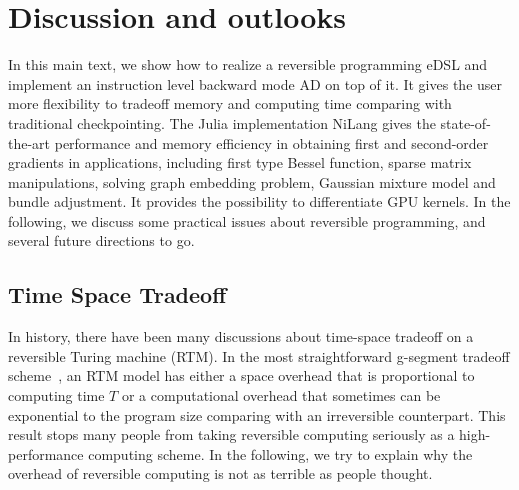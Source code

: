 \documentclass{article}
\newcommand{\<}{\langle}
\renewcommand{\>}{\rangle}
\theoremstyle{definition}\newtheorem{definition}{\textit{Definition}}
\begin{document}
\section{Discussion and outlooks}\label{sec:discussion}
In this main text, we show how to realize a reversible programming eDSL and implement an instruction level backward mode AD on top of it.
It gives the user more flexibility to tradeoff memory and computing time comparing with traditional checkpointing.
The Julia implementation NiLang gives the state-of-the-art performance and memory efficiency in obtaining first and second-order gradients in applications, including first type Bessel function, sparse matrix manipulations, solving graph embedding problem, Gaussian mixture model and bundle adjustment. It provides the possibility to differentiate GPU kernels.
In the following, we discuss some practical issues about reversible programming, and several future directions to go.

\subsection{Time Space Tradeoff}\label{sec:timespace}
In history, there have been many discussions about time-space tradeoff on a reversible Turing machine (RTM).
In the most straightforward g-segment tradeoff scheme~\cite{Bennett1989,Levine1990}, an RTM model has either a space overhead that is proportional to computing time $T$ or a computational overhead that sometimes can be exponential to the program size comparing with an irreversible counterpart.
This result stops many people from taking reversible computing seriously as a high-performance computing scheme.
In the following, we try to explain why the overhead of reversible computing is not as terrible as people thought.
\end{document}
